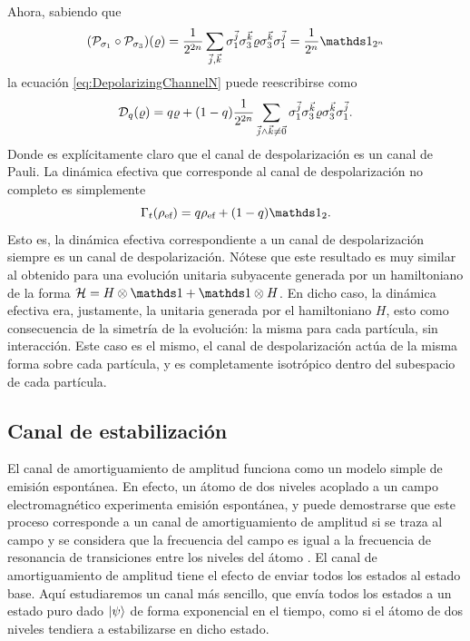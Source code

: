 Ahora, sabiendo que
\begin{equation}
    \qty(\mcP_{\pauli{1}}\circ \mcP_{\pauli{3}})(\varrho)=\frac{1}{2^{2n}}\sum_{\vec{j},\vec{k}}\pauli{1}^{\vec{j}}\pauli{3}^{\vec{k}}\varrho\pauli{3}^{\vec{k}}\pauli{1}^{\vec{j}}=\frac{1}{2^{n}}\Id_{2^{n}}\nonumber
\end{equation}
la ecuación \ref{eq:DepolarizingChannelN} puede reescribirse como
\begin{equation}
    \mathcal{D}_{q}(\varrho)=q\varrho+(1-q)\frac{1}{2^{2n}}\sum_{\vec{j}\land\vec{k}\neq\vec{0}}\sigma_{1}^{\vec{j}}\sigma_{3}^{\vec{k}}\varrho\sigma_{3}^{\vec{k}}\sigma_{1}^{\vec{j}}.\nonumber
\end{equation}
Donde es explícitamente claro que el canal de despolarización es un canal de Pauli. La dinámica efectiva que corresponde al canal de despolarización no completo es simplemente
\begin{equation}\label{eq:EffectiveDepolarizing}
    \Gamma_{t}(\rho_{\ef})=q\rho_{\ef}+(1-q)\Id_{2}.
\end{equation}
Esto es, la dinámica efectiva correspondiente a un canal de despolarización siempre es un canal de despolarización. Nótese que este resultado es muy similar al obtenido para una evolución unitaria subyacente generada por un hamiltoniano de la forma $\mcH=H\otimes\Id+\Id\otimes H$. En dicho caso, la dinámica efectiva era, justamente, la unitaria generada por el hamiltoniano $H$, esto como consecuencia de la simetría de la evolución: la misma para cada partícula, sin interacción. Este caso es el mismo, el canal de despolarización actúa de la misma forma sobre cada partícula, y es completamente isotrópico dentro del subespacio de cada partícula.

\subsection{Canal de estabilización}

El canal de amortiguamiento de amplitud funciona como un modelo simple de emisión espontánea. En efecto, un átomo de dos niveles acoplado a un campo electromagnético experimenta emisión espontánea, y puede demostrarse que este proceso corresponde a un canal de amortiguamiento de amplitud si se traza al campo y se considera que la frecuencia del campo es igual a la frecuencia de resonancia de transiciones entre los niveles del átomo \cite{Fox}. El canal de amortiguamiento de amplitud tiene el efecto de enviar todos los estados al estado base. Aquí estudiaremos un canal más sencillo, que envía todos los estados a un estado puro dado $\ket{\psi}$ de forma exponencial en el tiempo, como si el átomo de dos niveles tendiera a estabilizarse en dicho estado.

